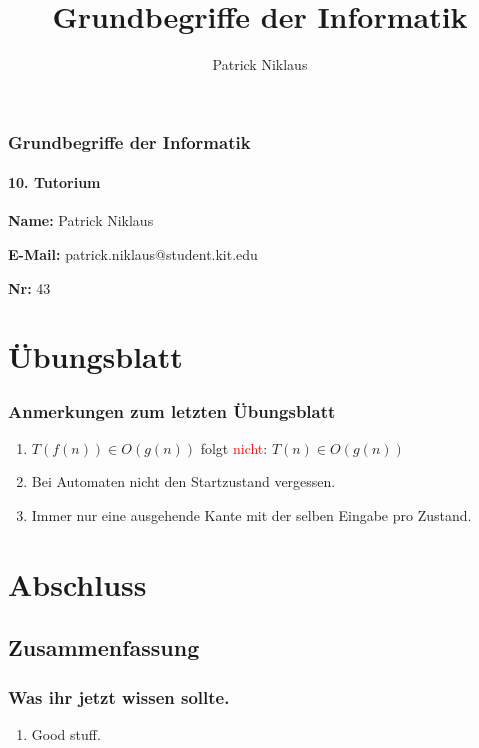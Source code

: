 \documentclass{beamer}
\title{Grundbegriffe der Informatik}
\author{Patrick Niklaus}
\newcommand{\warn}[1]{\textcolor{red}{#1}}
\begin{document}
\begin{frame}
  \frametitle{Grundbegriffe der Informatik}
  \framesubtitle{10. Tutorium}
  \begin{description}
    \item \textbf{Name:} Patrick Niklaus
    \item \textbf{E-Mail:} patrick.niklaus@student.kit.edu
    \item \textbf{Nr:} 43
  \end{description}
\end{frame}

\section{Übungsblatt}
\begin{frame}
  \frametitle{Anmerkungen zum letzten Übungsblatt}
  \begin{enumerate}
    \item $T(f(n)) \in O(g(n))$ folgt \warn{nicht}: $T(n) \in O(g(n))$
    \item Bei Automaten nicht den Startzustand vergessen.
    \item Immer nur eine ausgehende Kante mit der selben Eingabe pro Zustand.
  \end{enumerate}
\end{frame}



\section{Abschluss}
\subsection{Zusammenfassung}
\begin{frame}
  \frametitle{Was ihr jetzt wissen sollte.}
  \begin{enumerate}
    \item Good stuff.
  \end{enumerate}
\end{frame}
\end{document}
